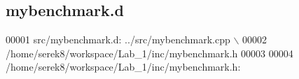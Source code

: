 \hypertarget{mybenchmark_8d}{\subsection{mybenchmark.\-d}
\label{mybenchmark_8d}
}

\begin{DoxyCode}
00001 src/mybenchmark.d: ../src/mybenchmark.cpp \(\backslash\)
00002  /home/serek8/workspace/Lab\_1/inc/mybenchmark.h
00003 
00004 /home/serek8/workspace/Lab\_1/inc/mybenchmark.h:
\end{DoxyCode}
